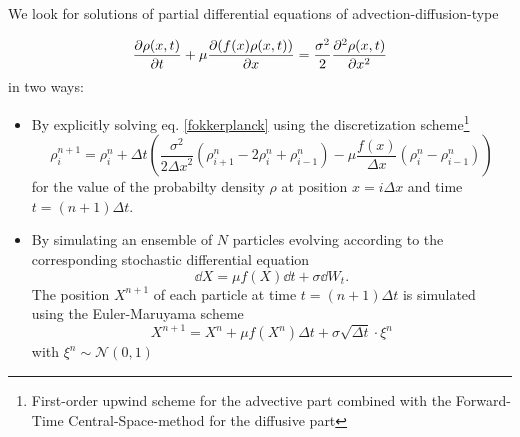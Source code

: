 

We look for solutions of partial differential equations of advection-diffusion-type

\begin{equation} 
\label{fokkerplanck}
\frac{\partial \rho(x,t)}{\partial t} + \mu \frac{\partial (f(x) \rho(x,t))}{\partial x} = \frac{\sigma^2}{2}  \frac{\partial^2 \rho(x,t)}{\partial x^2} 
\end{equation}
in two ways:
\begin{itemize}
\item By explicitly solving eq. \eqref{fokkerplanck} using the discretization scheme\footnote{First-order upwind scheme for the advective part combined with the Forward-Time Central-Space-method for the diffusive part}
\begin{equation} 
\label{pde_discretization}
\rho_i^{n+1} = \rho_i^n + \Delta t \left( \frac{\sigma^2}{2{\Delta x}^2} \left( \rho_{i+1}^{n} - 2 \rho_i^n + \rho_{i-1}^n \right)  - \mu \frac{f(x)}{\Delta x} (\rho_i^n - \rho_{i-1}^n) \right)
\end{equation}
for the value of the probabilty density $\rho$ at position $x=i \Delta x$ and time $t=(n+1) \Delta t$.
\item By simulating an ensemble of $N$ particles evolving according to the corresponding stochastic differential equation  
\begin{equation} 
\label{SDE}
    \dd X = \mu f(X) \dd t + \sigma \dd{W_t}.
\end{equation}
 The position $X^{n+1}$ of each  particle  at time $t= (n+1) \Delta t$ is simulated using the Euler-Maruyama scheme
\begin{equation}
   X^{n + 1} = X^{n} + \mu f(X^n) \Delta t +  \sigma \sqrt{\Delta t}\cdot \xi^n \label{Euler-Mar}
\end{equation}
with $\xi^n  \sim \mathcal{N} (0,1)$
\end{itemize}

